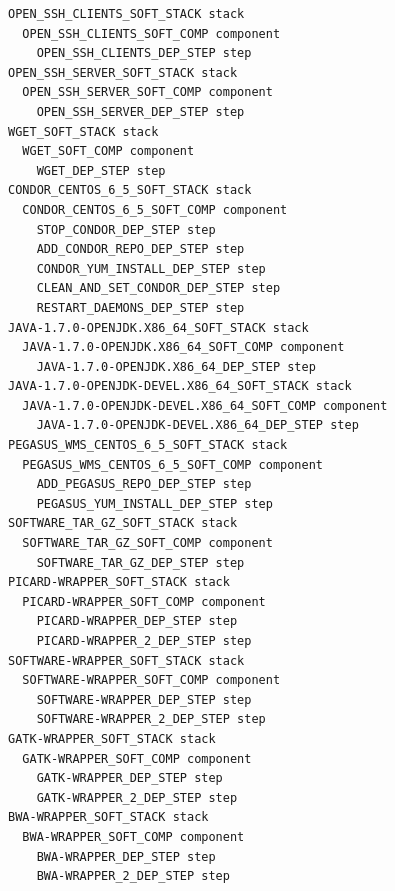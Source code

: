 \begin{lstlisting}[caption={Abstract deployment plan of the SoyKB WF.}, label={lst:plan-soykb}, basicstyle=\scriptsize]
OPEN_SSH_CLIENTS_SOFT_STACK stack
  OPEN_SSH_CLIENTS_SOFT_COMP component
    OPEN_SSH_CLIENTS_DEP_STEP step
OPEN_SSH_SERVER_SOFT_STACK stack
  OPEN_SSH_SERVER_SOFT_COMP component
    OPEN_SSH_SERVER_DEP_STEP step
WGET_SOFT_STACK stack
  WGET_SOFT_COMP component
    WGET_DEP_STEP step
CONDOR_CENTOS_6_5_SOFT_STACK stack
  CONDOR_CENTOS_6_5_SOFT_COMP component
    STOP_CONDOR_DEP_STEP step
    ADD_CONDOR_REPO_DEP_STEP step
    CONDOR_YUM_INSTALL_DEP_STEP step
    CLEAN_AND_SET_CONDOR_DEP_STEP step
    RESTART_DAEMONS_DEP_STEP step
JAVA-1.7.0-OPENJDK.X86_64_SOFT_STACK stack
  JAVA-1.7.0-OPENJDK.X86_64_SOFT_COMP component
    JAVA-1.7.0-OPENJDK.X86_64_DEP_STEP step
JAVA-1.7.0-OPENJDK-DEVEL.X86_64_SOFT_STACK stack
  JAVA-1.7.0-OPENJDK-DEVEL.X86_64_SOFT_COMP component
    JAVA-1.7.0-OPENJDK-DEVEL.X86_64_DEP_STEP step
PEGASUS_WMS_CENTOS_6_5_SOFT_STACK stack
  PEGASUS_WMS_CENTOS_6_5_SOFT_COMP component
    ADD_PEGASUS_REPO_DEP_STEP step
    PEGASUS_YUM_INSTALL_DEP_STEP step
SOFTWARE_TAR_GZ_SOFT_STACK stack
  SOFTWARE_TAR_GZ_SOFT_COMP component
    SOFTWARE_TAR_GZ_DEP_STEP step
PICARD-WRAPPER_SOFT_STACK stack
  PICARD-WRAPPER_SOFT_COMP component
    PICARD-WRAPPER_DEP_STEP step
    PICARD-WRAPPER_2_DEP_STEP step
SOFTWARE-WRAPPER_SOFT_STACK stack
  SOFTWARE-WRAPPER_SOFT_COMP component
    SOFTWARE-WRAPPER_DEP_STEP step
    SOFTWARE-WRAPPER_2_DEP_STEP step
GATK-WRAPPER_SOFT_STACK stack
  GATK-WRAPPER_SOFT_COMP component
    GATK-WRAPPER_DEP_STEP step
    GATK-WRAPPER_2_DEP_STEP step
BWA-WRAPPER_SOFT_STACK stack
  BWA-WRAPPER_SOFT_COMP component
    BWA-WRAPPER_DEP_STEP step
    BWA-WRAPPER_2_DEP_STEP step
\end{lstlisting}



